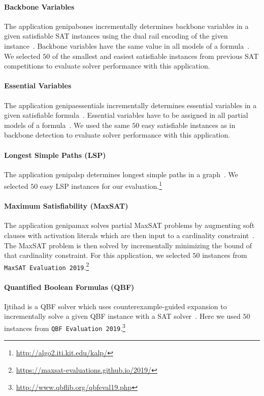 \documentclass{elsarticle}
\begin{document}
\paragraph{Backbone Variables}

The application \textsf{genipabones} incrementally determines backbone variables in a given satisfiable SAT instances using the dual rail encoding of the given instance~\cite{Balyo:2015:SATRace}.
Backbone variables have the same value in all models of a formula~\cite{Janota:2015:Backbones}. 
We selected $50$ of the smallest and easiest satisfiable instances from previous SAT competitions to evaluate solver performance with this application. 

\paragraph{Essential Variables}

The application \textsf{genipaessentials} incrementally determines essential variables in a given satisfiable formula~\cite{Balyo:2015:SATRace}. 
Essential variables have to be assigned in all partial models of a formula~\cite{Bryant:1987:Essentials}. 
We used the same $50$ easy satisfiable instances as in backbone detection to evaluate solver performance with this application. 

\paragraph{Longest Simple Paths (LSP)}

The application \textsf{genipalsp} determines longest simple paths in a graph~\cite{Balyo:2019:LSP}. 
We selected $50$ easy LSP instances for our evaluation.\footnote{\url{http://algo2.iti.kit.edu/kalp/}} 

\paragraph{Maximum Satisfiability (MaxSAT)}

The application \textsf{genipamax} solves partial MaxSAT problems by augmenting soft clauses with activation literals which are then input to a cardinality constraint~\cite{Philipp:2015:PBLib}. 
The MaxSAT problem is then solved by incrementally minimizing the bound of that cardinality constraint. 
For this application, we selected $50$ instances from \texttt{MaxSAT Evaluation 2019}.\footnote{\url{https://maxsat-evaluations.github.io/2019/}}

\paragraph{Quantified Boolean Formulas (QBF)}
\textsf{Ijtihad} is a QBF solver which uses counter\-example-guided expansion to incrementally solve a given QBF instance with a SAT solver~\cite{Bloem:2018:QBFSAT}. 
Here we used $50$ instances from \texttt{QBF Evaluation 2019}.\footnote{\url{http://www.qbflib.org/qbfeval19.php}}
\end{document}
